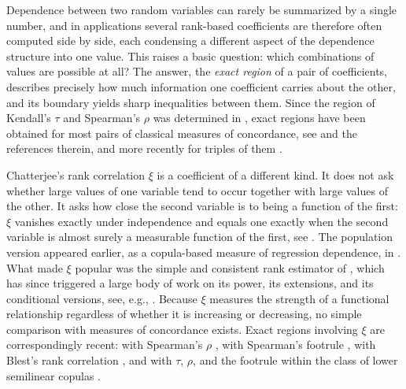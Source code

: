 \documentclass[twocolumn,a4paper]{article}
\makeatletter
\renewcommand\section{\@startsection{section}{1}{\z@}{-3.5ex \@plus -1ex \@minus -.2ex}{2.3ex \@plus.2ex}{\normalfont\Large\bfseries\raggedright}}
\numberwithin{equation}{section}
\theoremstyle{remark}
\newcommand{\1}{\mathbf{1}}
\makeatother
\begin{document}
\section{Introduction}\label{sec:intro}

Dependence between two random variables can rarely be summarized by a single number, and in applications several rank-based coefficients are therefore often computed side by side, each condensing a different aspect of the dependence structure into one value.
This raises a basic question: which combinations of values are possible at all?
The answer, the \emph{exact region} of a pair of coefficients, describes precisely how much information one coefficient carries about the other, and its boundary yields sharp inequalities between them.
Since the region of Kendall's \(\tau\) and Spearman's \(\rho\) was determined in \cite{schreyer2017exact}, exact regions have been obtained for most pairs of classical measures of concordance, see \cite{kokolbukovsek2019relation,bukovvsek2021exact,bukovvsek2022exact,bukovvsek2023exact,bukovvsek2024exact} and the references therein, and more recently for triples of them \cite{bukovvsek2025exact,kokolbukovsek2026footrule,orenday2026taufootrulebeta}.

Chatterjee's rank correlation \(\xi\) \cite{chatterjee2020} is a coefficient of a different kind.
It does not ask whether large values of one variable tend to occur together with large values of the other.
It asks how close the second variable is to being a function of the first: \(\xi\) vanishes exactly under independence and equals one exactly when the second variable is almost surely a measurable function of the first, see \cite[Thm.~1.1]{chatterjee2020}.
The population version appeared earlier, as a copula-based measure of regression dependence, in \cite{dette2013copula}.
What made \(\xi\) popular was the simple and consistent rank estimator of \cite{chatterjee2020}, which has since triggered a large body of work on its power, its extensions, and its conditional versions, see, e.g., \cite{chatterjee2021,shi2022power,auddy2021exact,deb2020b,Ansari-LFT-2025}.
Because \(\xi\) measures the strength of a functional relationship regardless of whether it is increasing or decreasing, no simple comparison with measures of concordance exists.
Exact regions involving \(\xi\) are correspondingly recent: with Spearman's \(\rho\) \cite{ansari2026exact}, with Spearman's footrule \cite{rockel2026exact}, with Blest's rank correlation \cite{rockel2026blest}, and with \(\tau\), \(\rho\), and the footrule within the class of lower semilinear copulas \cite{fuchs2025exact}.
\end{document}
